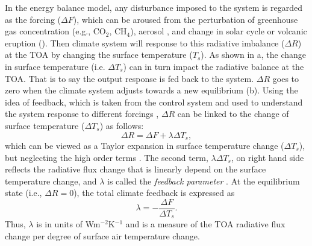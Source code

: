  In the energy balance model, any disturbance imposed to the system is regarded as the forcing ($\Delta F$), which can be aroused from the perturbation of greenhouse gas concentration (e.g., CO$_2$, CH$_4$), aerosol \citep{Ramanathan2001aerosols}, and change in solar cycle \citep{Frohlich2004solar} or volcanic eruption (). Then climate system will response to this radiative imbalance ($\Delta R$) at the TOA  by changing the surface temperature ($T_s$). As shown in a, the change in surface temperature (i.e. $\Delta T_s$) can in turn impact the radiative balance at the TOA. That is to say the output response is fed back to the system. $\Delta R$ goes to zero when the climate system adjusts towards a new equilibrium (b). Using the idea of feedback, which is taken from the control system and used to understand the system response to different forcings \citep{Stephens2005cloud},
$\Delta R$ can be linked to the change of surface temperature ($\Delta T_s$) as follows:
\begin{equation}
    \Delta R = \Delta F + \lambda \Delta T_s,
    \label{eq:imbalance_forcing_lambda1}
\end{equation}
which can be viewed as a Taylor expansion in surface temperature change ($\Delta T_s$), but neglecting the high order terms \citep{Feldl2013a}. The second term, $\lambda \Delta T_s$, on right hand side reflects the radiative flux change that is linearly depend on the surface temperature change, and $\lambda$ is called the \textit{feedback parameter} \citep{Gregory2004}. At the equilibrium state (i.e., $\Delta R=0$), the total climate feedback is expressed as 
\begin{equation}
    \lambda = -\frac{\Delta F}{\Delta T_s}.
\end{equation}
Thus, $\lambda$ is in units of Wm$^{-2}$K$^{-1}$ and is a measure of the TOA radiative flux change per degree of surface air temperature change. 

